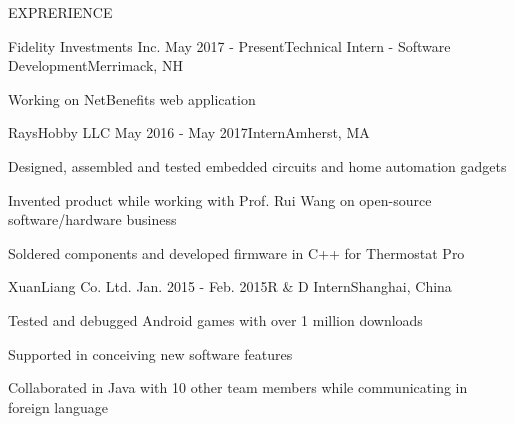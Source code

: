 \documentclass{resume} %
\begin{document}
	\begin{rSection}{EXPRERIENCE}
			
		\begin{rSubsection}{Fidelity Investments Inc.} {May 2017 - Present}{Technical Intern - Software Development}{Merrimack, NH}
			\item Working on NetBenefits web application
		\end{rSubsection}
	
		\begin{rSubsection}{RaysHobby LLC} {May 2016 - May 2017}{Intern}{Amherst, MA}
			\item Designed, assembled and tested embedded circuits and home automation gadgets
			\item Invented product while working with Prof. Rui Wang on open-source software/hardware business
			\item Soldered components and developed firmware in C++ for Thermostat Pro
		\end{rSubsection}
	
		\begin{rSubsection}{XuanLiang Co. Ltd.} {Jan. 2015 - Feb. 2015}{R \& D  Intern}{Shanghai, China}
			\item Tested and debugged Android games with over 1 million downloads
			\item Supported in conceiving new software features
			\item Collaborated in Java with 10 other team members while communicating in foreign language
		\end{rSubsection}
	
	\end{rSection}
	
	
\end{document}

